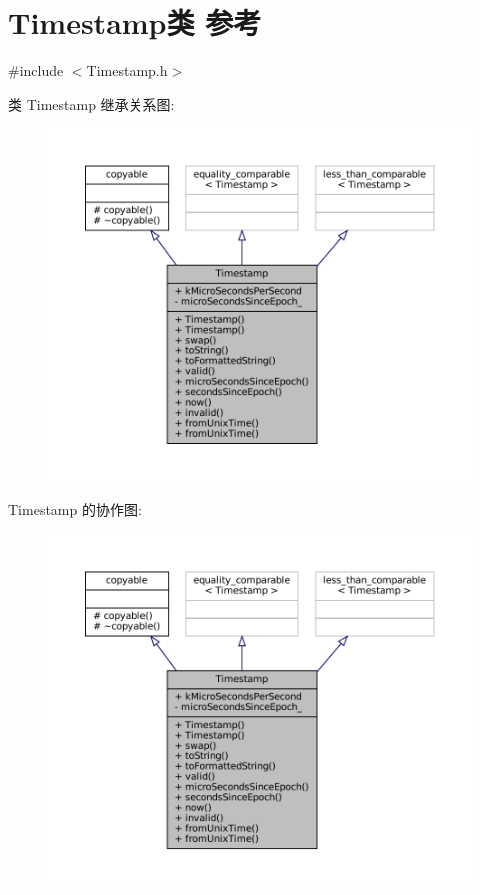 \hypertarget{classmuduo_1_1Timestamp}{}\section{Timestamp类 参考}
\label{classmuduo_1_1Timestamp}


{\ttfamily \#include $<$Timestamp.\+h$>$}



类 Timestamp 继承关系图\+:
\nopagebreak
\begin{figure}[H]
\begin{center}
\leavevmode
\includegraphics[width=350pt]{classmuduo_1_1Timestamp__inherit__graph}
\end{center}
\end{figure}


Timestamp 的协作图\+:
\nopagebreak
\begin{figure}[H]
\begin{center}
\leavevmode
\includegraphics[width=350pt]{classmuduo_1_1Timestamp__coll__graph}
\end{center}
\end{figure}
